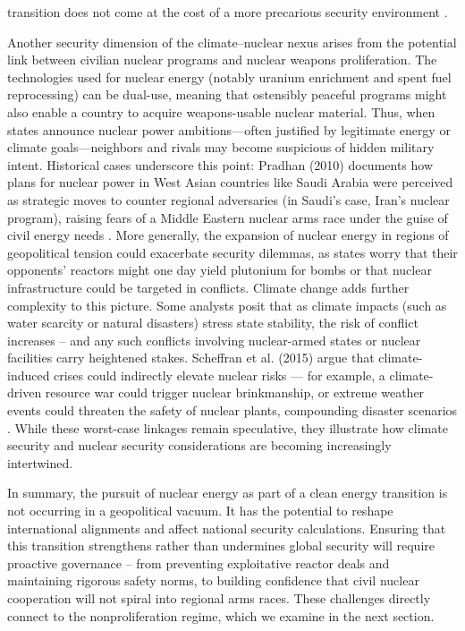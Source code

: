 \documentclass[11,5 pt]{article}
\begin{document}
transition does not come at the cost of a more precarious security environment \cite{LOVERING2020111306}.

Another security dimension of the climate–nuclear nexus arises from the potential link between civilian nuclear programs and nuclear weapons proliferation. The technologies used for nuclear energy (notably uranium enrichment and spent fuel reprocessing) can be dual-use, meaning that ostensibly peaceful programs might also enable a country to acquire weapons-usable nuclear material. Thus, when states announce nuclear power ambitions—often justified by legitimate energy or climate goals—neighbors and rivals may become suspicious of hidden military intent. Historical cases underscore this point: Pradhan (2010) documents how plans for nuclear power in West Asian countries like Saudi Arabia were perceived as strategic moves to counter regional adversaries (in Saudi’s case, Iran’s nuclear program), raising fears of a Middle Eastern nuclear arms race under the guise of civil energy needs \cite{Pradhan2010843}. More generally, the expansion of nuclear energy in regions of geopolitical tension could exacerbate security dilemmas, as states worry that their opponents’ reactors might one day yield plutonium for bombs or that nuclear infrastructure could be targeted in conflicts. Climate change adds further complexity to this picture. Some analysts posit that as climate impacts (such as water scarcity or natural disasters) stress state stability, the risk of conflict increases – and any such conflicts involving nuclear-armed states or nuclear facilities carry heightened stakes. Scheffran et al. (2015) argue that climate-induced crises could indirectly elevate nuclear risks — for example, a climate-driven resource war could trigger nuclear brinkmanship, or extreme weather events could threaten the safety of nuclear plants, compounding disaster scenarios \cite{scheffran2015climate}. While these worst-case linkages remain speculative, they illustrate how climate security and nuclear security considerations are becoming increasingly intertwined.

In summary, the pursuit of nuclear energy as part of a clean energy transition is not occurring in a geopolitical vacuum. It has the potential to reshape international alignments and affect national security calculations. Ensuring that this transition strengthens rather than undermines global security will require proactive governance – from preventing exploitative reactor deals and maintaining rigorous safety norms, to building confidence that civil nuclear cooperation will not spiral into regional arms races. These challenges directly connect to the nonproliferation regime, which we examine in the next section.
\end{document}

